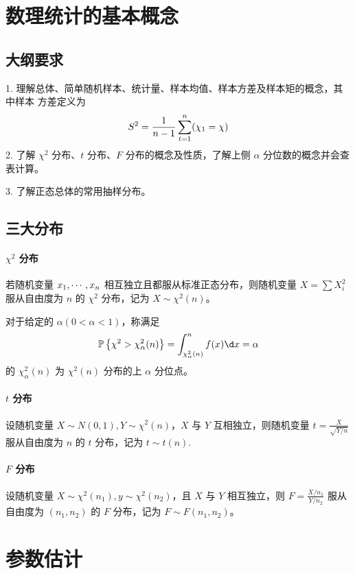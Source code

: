 \section{数理统计的基本概念}

\subsection{大纲要求}

1. 理解总体、简单随机样本、统计量、样本均值、样本方差及样本矩的概念，其中样本
方差定义为
\[ S^2 = \frac{1}{n-1} \sum_{t=1}^n (\chi_1 = \chi) \cal \]
2. 了解 $\chi^2$ 分布、$t$ 分布、$F$ 分布的概念及性质，了解上侧 $\alpha$ 分位数的概念并会查表计算。

3. 了解正态总体的常用抽样分布。

\subsection{三大分布}

\paragraph{$\chi^2$ 分布}

若随机变量 $x_1,\cdots,x_n$ 相互独立且都服从标准正态分布，则随机变量 $X = \sum X_i^2$ 服从自由度为 $n$ 的 $\chi^2$ 分布，记为 $X \sim \chi^2(n)$。

对于给定的 $\alpha(0 < \alpha < 1)$，称满足
\[ \bbP\left\{\chi^2 > \chi_\alpha^2(n)\right\} = \int_{\chi_\alpha^2(n)}^n f(x) \d x = \alpha  \]
的 $\chi_\alpha^2(n)$ 为 $\chi^2(n)$ 分布的上 $\alpha$ 分位点。

\paragraph{$t$ 分布}

设随机变量 $X \sim N(0, 1), Y \sim \chi^2(n)$，$X$ 与 $Y$ 互相独立，则随机变量 $t = \frac{X}{\sqrt{Y / n}}$ 服从自由度为 $n$ 的 $t$ 分布，记为 $t \sim t(n)$.

\paragraph{$F$ 分布}

设随机变量 $X \sim \chi^2(n_1), y \sim \chi^2(n_2)$，且 $X$ 与 $Y$ 相互独立，则 $F = \frac{X / n_1}{Y / n_2}$ 服从自由度为 $(n_1, n_2)$ 的 $F$ 分布，记为 $F \sim F(n_1, n_2)$。


\section{参数估计}

